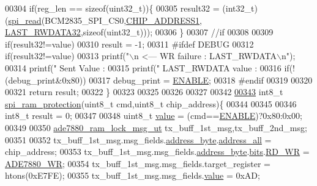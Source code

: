 \begin{DoxyCode}
{{{{{{{{{{{{00304     \textcolor{keywordflow}{if}(reg\_len == \textcolor{keyword}{sizeof}(uint32\_t))\{
00305         result32 = (int32\_t)(\hyperlink{a00007_ga7ad9f65ee46aca507374096506a0b1c4}{spi\_read}(BCM2835\_SPI\_CS0,\hyperlink{a00037_a94de2b046db6e10257ef4481c0a15eaa}{CHIP\_ADDRESS1},
      \hyperlink{a00036_a0d09934e23666ce21357121f281f2f2a}{LAST\_RWDATA32},\textcolor{keyword}{sizeof}(uint32\_t)));      
00306     \}   
00307     \textcolor{comment}{//if }
00308 
00309      \textcolor{keywordflow}{if}(result32!=value)
00310          result = -1;   
00311 \textcolor{preprocessor}{     #ifdef DEBUG}
00312 \textcolor{preprocessor}{}       \textcolor{keywordflow}{if}(result32!=value)
00313        printf(\textcolor{stringliteral}{"\(\backslash\)n                                               <---  WR failure : LAST\_RWDATA\(\backslash\)n"});
00314        printf(\textcolor{stringliteral}{"       Sent Value        :%
00315        printf(\textcolor{stringliteral}{"       LAST\_RWDATA value :%
00316       \textcolor{keywordflow}{if}(!(debug\_print&0x80))
00317        debug\_print = \hyperlink{a00037_a514ad415fb6125ba296793df7d1a468a}{ENABLE};
00318 \textcolor{preprocessor}{     #endif}
00319 \textcolor{preprocessor}{}     
00320      
00321     \textcolor{keywordflow}{return} result;
00322 \}   
00323  
00325  
00326  
00327 
00342 
\hypertarget{a00040_source_l00343}{}\hyperlink{a00007_gae51aa618efe7af5f3a68ac324f2a7840}{00343} int8\_t \hyperlink{a00007_gae51aa618efe7af5f3a68ac324f2a7840}{spi\_ram\_protection}(uint8\_t cmd,uint8\_t chip\_address)\{
00344       
00345       
00346     int8\_t result = 0;  
00347     
00348     uint8\_t \hyperlink{a00041_a638e4503e0ae6ce655b7ad2e17e8f0ad}{value} = (cmd==\hyperlink{a00037_a514ad415fb6125ba296793df7d1a468a}{ENABLE})?0x80:0x00;
00349     
00350      \hyperlink{a00012}{ade7880\_ram\_lock\_msg\_ut} tx\_buff\_1st\_msg,tx\_buff\_2nd\_msg;
00351 
00352      tx\_buff\_1st\_msg.msg\_fields.\hyperlink{a00012_af6a65bac733ea3e9b1d24b065163d49a}{address\_byte}.\hyperlink{a00011_a7bf6defa0ae3fb2bca057a3a97d4f740}{address\_all} = chip\_address;
00353      tx\_buff\_1st\_msg.msg\_fields.\hyperlink{a00012_af6a65bac733ea3e9b1d24b065163d49a}{address\_byte}.\hyperlink{a00011_ae121725fb28cc26495969d71e0e0d42e}{bits}.\hyperlink{a00011_a97e2668c8e5470fa66185f16dc2e8045}{RD\_WR} = 
      \hyperlink{a00041_a36352e0d88dc7c5ede031013c75a678f}{ADE7880\_WR};
00354      tx\_buff\_1st\_msg.msg\_fields.target\_register = htons(0xE7FE);
00355      tx\_buff\_1st\_msg.msg\_fields.\hyperlink{a00012_a638e4503e0ae6ce655b7ad2e17e8f0ad}{value} = 0xAD;
}}}}}}}}}}}}}}
\end{DoxyCode}
